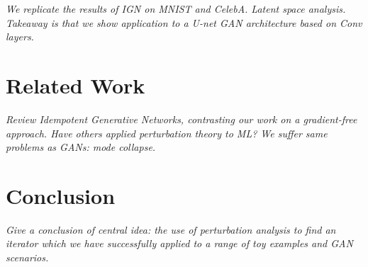 \documentclass{article}
\begin{document}
\textit{We replicate the results of IGN on MNIST and CelebA. Latent space analysis. Takeaway is that we show application to a U-net GAN architecture based on Conv layers.}

\section{Related Work}
\textit{Review Idempotent Generative Networks, contrasting our work on a gradient-free approach. Have others applied perturbation theory to ML? We suffer same problems as GANs: mode collapse.}

\section{Conclusion}
\textit{Give a conclusion of central idea: the use of perturbation analysis to find an iterator which we have successfully applied to a range of toy examples and GAN scenarios.}
\end{document}
